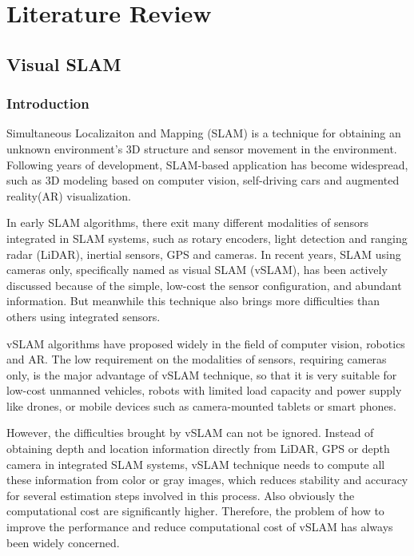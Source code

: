
\chapter{Literature Review}

\section{Visual SLAM}

\subsection{Introduction}
Simultaneous Localizaiton and Mapping (SLAM) is a technique for obtaining an unknown environment's 3D structure and sensor movement in the environment. Following years of development, SLAM-based application has become widespread, such as 3D modeling based on computer vision, self-driving cars and augmented reality(AR) visualization. 

In early SLAM algorithms, there exit many different modalities of sensors integrated in SLAM systems, such as rotary encoders, light detection and ranging radar (LiDAR), inertial sensors, GPS and cameras. In recent years, SLAM using cameras only,  specifically named as visual SLAM (vSLAM), has been actively discussed because of the simple, low-cost the sensor configuration, and  abundant information. But meanwhile this technique also brings more difficulties than others using integrated sensors\cite{taketomi2017visual}. 

vSLAM algorithms have proposed widely in the field of computer vision, robotics and AR. The low requirement on the modalities of sensors, requiring cameras only, is the major advantage of vSLAM technique, so that it is very suitable for low-cost unmanned vehicles, robots with limited load capacity and power supply like drones, or mobile devices such as camera-mounted tablets or smart phones.

However, the difficulties brought by vSLAM can not be ignored. Instead of obtaining depth and location information directly from LiDAR, GPS or depth camera in integrated SLAM systems, vSLAM technique needs to compute all these information from color or gray images, which reduces stability and accuracy for several estimation steps involved in this process. Also obviously the computational cost are significantly higher. Therefore, the problem of how to improve the performance and reduce computational cost of vSLAM has always been widely concerned.


